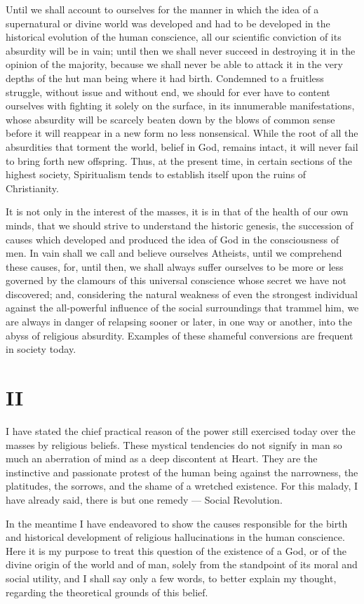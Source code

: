 \documentclass[12pt]{report}
\newcommand{\mychapter}[2]{
\setcounter{chapter}{#1}
    \setcounter{section}{0}
    \chapter*{#2}
    \addcontentsline{toc}{chapter}{#2}
}
\begin{document}
Until we shall account to ourselves for the manner in which the idea of a supernatural or divine world was developed and had to be developed in the historical evolution of the human conscience, all our scientific conviction of its absurdity will be in vain; until then we shall never succeed in destroying it in the opinion of the majority, because we shall never be able to attack it in the very depths of the hut man being where it had birth. Condemned to a fruitless struggle, without issue and without end, we should for ever have to content ourselves with fighting it solely on the surface, in its innumerable manifestations, whose absurdity will be scarcely beaten down by the blows of common sense before it will reappear in a new form no less nonsensical. While the root of all the absurdities that torment the world, belief in God, remains intact, it will never fail to bring forth new offspring. Thus, at the present time, in certain sections of the highest society, Spiritualism tends to establish itself upon the ruins of Christianity.


It is not only in the interest of the masses, it is in that of the health of our own minds, that we should strive to understand the historic genesis, the succession of causes which developed and produced the idea of God in the consciousness of men. In vain shall we call and believe ourselves Atheists, until we comprehend these causes, for, until then, we shall always suffer ourselves to be more or less governed by the clamours of this universal conscience whose secret we have not discovered; and, considering the natural weakness of even the strongest individual against the all-powerful influence of the social surroundings that trammel him, we are always in danger of relapsing sooner or later, in one way or another, into the abyss of religious absurdity. Examples of these shameful conversions are frequent in society today.

\mychapter{3}{II}


I have stated the chief practical reason of the power still exercised today over the masses by religious beliefs. These mystical tendencies do not signify in man so much an aberration of mind as a deep discontent at Heart. They are the instinctive and passionate protest of the human being against the narrowness, the platitudes, the sorrows, and the shame of a wretched existence. For this malady, I have already said, there is but one remedy — Social Revolution.


In the meantime I have endeavored to show the causes responsible for the birth and historical development of religious hallucinations in the human conscience. Here it is my purpose to treat this question of the existence of a God, or of the divine origin of the world and of man, solely from the standpoint of its moral and social utility, and I shall say only a few words, to better explain my thought, regarding the theoretical grounds of this belief.
\end{document}
